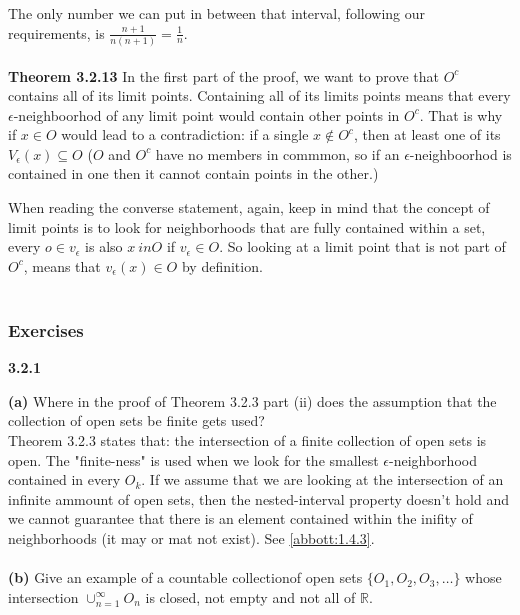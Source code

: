 The only number we can put in between that interval, following our requirements, is $\frac{n+1}{n(n+1)} = \frac{1}{n}$.
\\~\\


\textbf{Theorem 3.2.13}
In the first part of the proof, we want to prove that $O^c$ contains all of its limit points.
Containing all of its limits points means that every $\epsilon$-neighboorhod of any limit point would
contain other points in $O^c$.
That is why if $x\in O$ would lead to a contradiction: if a single $x \notin O^c$, then at least one of its
$V_\epsilon (x) \subseteq O$ ($O$ and $O^c$ have no members in commmon, so if an $\epsilon$-neighboorhod is contained
in one then it cannot contain points in the other.)

When reading the converse statement, again, keep in mind that the concept of limit points is to look for
neighborhoods that are fully contained within a set, every $o \in v_\epsilon $ is also $x \ in O$ if
$v_\epsilon \in O$.
So looking at a limit point that is not part of $O^c$, means that $v_{\epsilon} (x) \in O$ by definition.
\\~\\


\subsubsection{Exercises}

\textbf{3.2.1}

\textbf{(a)} Where in the proof of Theorem 3.2.3 part (ii) does the assumption that the collection of
open sets be finite gets used?
\\

Theorem 3.2.3 states that: the intersection of a finite collection of open sets is open.
The "finite-ness" is used when we look for the smallest $\epsilon$-neighborhood contained in every $O_k$.
If we assume that we are looking at the intersection of an infinite ammount of open sets, then the nested-interval
property doesn't hold and we cannot guarantee that there is an element contained within the inifity of neighborhoods (it may or mat not exist).
See \ref{abbott:1.4.3}.
\\~\\

\textbf{(b)} Give an example of a countable collectionof open sets $\{O_1, O_2, O_3, \ldots\}$
whose intersection $\cup^{\infty}_{n=1} O_n$ is closed, not empty and not all of $\mathbb{R}$.
\\~\\


